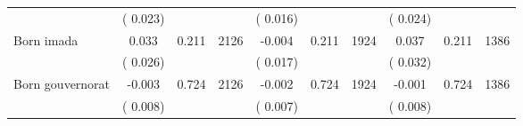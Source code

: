 \begin{tabular}{l*{9}{c}}
                               &        (       0.023) & &                                                                 &       (       0.016) & &                                                          &       (       0.024) & &                                          \\ 
 Born imada                        &              0.033                &        0.211 & 2126                &             -0.004 &        0.211 & 1924                       &        0.037 &        0.211 & 1386                             \\ 
                               &        (       0.026) & &                                                                        &       (       0.017) & &                                                         &       (       0.032) & &                                         \\ 
 Born gouvernorat                        &             -0.003                &        0.724 & 2126                &             -0.002 &        0.724 & 1924                       &       -0.001 &        0.724 & 1386                             \\ 
                               &        (       0.008) & &                                                                        &       (       0.007) & &                                                         &       (       0.008) & &                                         \\ 
\hline \end{tabular}                                                                                                                                                      